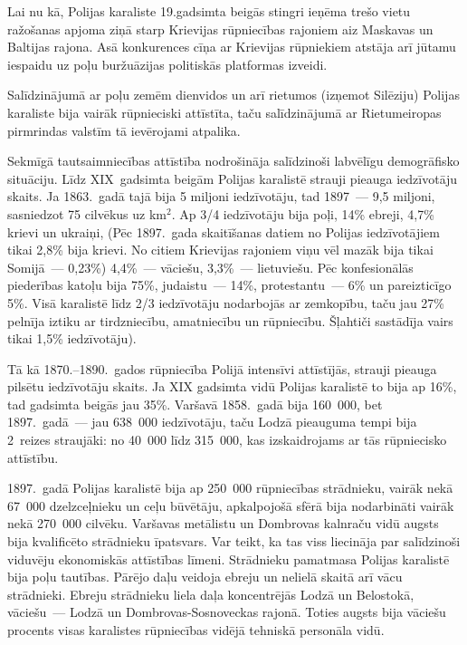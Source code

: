\documentclass[twoside,a5paper,12pt,fleqn,openany]{extbook}
\begin{document}
Lai nu kā, Polijas karaliste 19.gadsimta beigās stingri ieņēma trešo vietu ražošanas apjoma ziņā starp Krievijas rūpniecības rajoniem aiz Maskavas un Baltijas rajona. Asā konkurences cīņa ar Krievijas rūpniekiem atstāja arī jūtamu iespaidu uz poļu buržuāzijas politiskās platformas izveidi.

Salīdzinājumā ar poļu zemēm dienvidos un arī rietumos (izņemot Silēziju) Polijas karaliste bija vairāk rūpnieciski attīstīta, taču salīdzinājumā ar Rietumeiropas pirmrindas valstīm tā ievērojami atpalika.

Sekmīgā tautsaimniecības attīstība nodrošināja salīdzinoši labvēlīgu demogrāfisko situāciju. Līdz XIX~gadsimta beigām Polijas karalistē strauji pieauga iedzīvotāju skaits. Ja 1863.~gadā tajā bija 5 miljoni iedzīvotāju, tad 1897~--- 9,5 miljoni, sasniedzot 75 cilvēkus uz km$^{2}$. Ap 3/4 iedzīvotāju bija poļi, 14\% ebreji, 4,7\% krievi un ukraiņi, (Pēc 1897.~gada skaitīšanas datiem no Polijas iedzīvotājiem tikai 2,8\% bija krievi. No citiem Krievijas rajoniem viņu vēl mazāk bija tikai Somijā~--- 0,23\%) 4,4\%~--- vāciešu, 3,3\%~--- lietuviešu. Pēc konfesionālās piederības katoļu bija 75\%, judaistu~--- 14\%, protestantu~--- 6\% un pareizticīgo 5\%. Visā karalistē līdz 2/3 iedzīvotāju nodarbojās ar zemkopību, taču jau 27\% pelnīja iztiku ar tirdzniecību, amatniecību un rūpniecību. Šļahtiči sastādīja vairs tikai 1,5\% iedzīvotāju).

Tā kā 1870.--1890.~gados rūpniecība Polijā intensīvi attīstījās, strauji pieauga pilsētu iedzīvotāju skaits. Ja XIX gadsimta vidū Polijas karalistē to bija ap 16\%, tad gadsimta beigās jau 35\%. Varšavā 1858.~gadā bija 160~000, bet 1897.~gadā~--- jau 638~000 iedzīvotāju, taču Lodzā pieauguma tempi bija 2~reizes straujāki: no 40~000 līdz 315~000, kas izskaidrojams ar tās rūpniecisko attīstību.

1897.~gadā Polijas karalistē bija ap 250~000 rūpniecības strādnieku, vairāk nekā 67~000 dzelzceļnieku un ceļu būvētāju, apkalpojošā sfērā bija nodarbināti vairāk nekā 270~000 cilvēku. Varšavas metālistu un Dombrovas kalnraču vidū augsts bija kvalificēto strādnieku īpatsvars. Var teikt, ka tas viss liecināja par salīdzinoši viduvēju ekonomiskās attīstības līmeni. Strādnieku pamatmasa Polijas karalistē bija poļu tautības. Pārējo daļu veidoja ebreju un nelielā skaitā arī vācu strādnieki. Ebreju strādnieku liela daļa koncentrējās Lodzā un Belostokā, vāciešu~--- Lodzā un Dombrovas-Sosnoveckas rajonā. Toties augsts bija vāciešu procents visas karalistes rūpniecības vidējā tehniskā personāla vidū.
\end{document}
